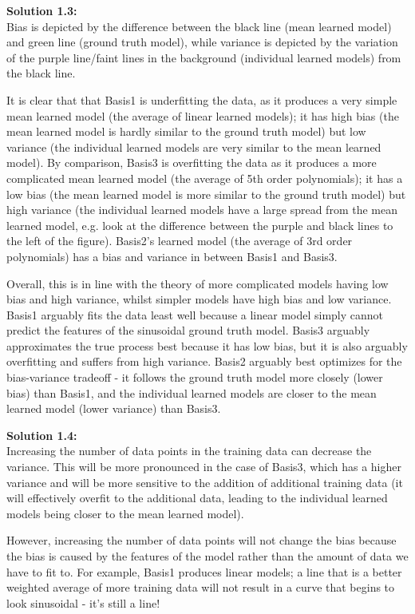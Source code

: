 \documentclass[submit]{harvardml}
\begin{document}
\noindent\textbf{Solution 1.3:}\\
Bias is depicted by the difference between the black line (mean learned model) and green line (ground truth model), while variance is depicted by the variation of the purple line/faint lines in the background (individual learned models) from the black line. 

It is clear that that Basis1 is underfitting the data, as it produces a very simple mean learned model (the average of linear learned models); it has high bias (the mean learned model is hardly similar to the ground truth model) but low variance (the individual learned models are very similar to the mean learned model). By comparison, Basis3 is overfitting the data as it produces a more complicated mean learned model (the average of 5th order polynomials); it has a low bias (the mean learned model is more similar to the ground truth model) but high variance (the individual learned models have a large spread from the mean learned model, e.g. look at the difference between the purple and black lines to the left of the figure). Basis2's learned model (the average of 3rd order polynomials) has a bias and variance in between Basis1 and Basis3.

Overall, this is in line with the theory of more complicated models having low bias and high variance, whilst simpler models have high bias and low variance. Basis1 arguably fits the data least well because a linear model simply cannot predict the features of the sinusoidal ground truth model. Basis3 arguably approximates the true process best because it has low bias, but it is also arguably overfitting and suffers from high variance. Basis2 arguably best optimizes for the bias-variance tradeoff - it follows the ground truth model more closely (lower bias) than Basis1, and the individual learned models are closer to the mean learned model (lower variance) than Basis3.\

\noindent\textbf{Solution 1.4:}\\
Increasing the number of data points in the training data can decrease the variance. This will be more pronounced in the case of Basis3, which has a higher variance and will be more sensitive to the addition of additional training data (it will effectively overfit to the additional data, leading to the individual learned models being closer to the mean learned model). 

However, increasing the number of data points will not change the bias because the bias is caused by the features of the model rather than the amount of data we have to fit to. For example, Basis1 produces linear models; a line that is a better weighted average of more training data will not result in a curve that begins to look sinusoidal - it's still a line!
\end{document}
